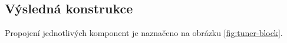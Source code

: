 \subsection{Výsledná konstrukce}
Propojení jednotlivých komponent je naznačeno na obrázku \ref{fig:tuner-block}.


